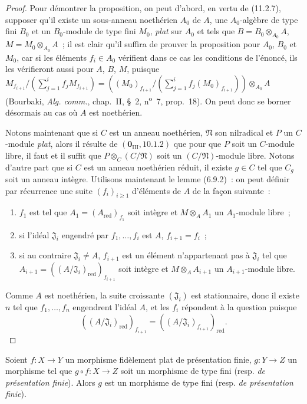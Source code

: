 \begin{proof}
Pour démontrer la proposition, on peut d'abord, en vertu de (11.2.7), supposer
qu'il existe un sous-anneau noethérien $A_0$ de $A$, une $A_0$-algèbre de type
fini $B_0$ et un $B_0$-module de type fini $M_0$, \emph{plat} sur $A_0$ et tels que
$B=B_0\otimes_{A_0}A$, $M=M_0\otimes_{A_0}A$~; il est clair qu'il suffira de
prouver la proposition pour $A_0$, $B_0$ et $M_0$, car si les éléments
$f_i\in A_0$ vérifient dans ce cas les conditions de l'énoncé, ils les
vérifieront aussi pour $A$, $B$, $M$, puisque
$M_{f_{i+1}}/(\sum_{j=1}^{i}f_jM_{f_{i+1}})
=((M_0)_{f_{i+1}}/(\sum_{j=1}^{i}f_j(M_0)_{f_{i+1}}))
\otimes_{A_0}A$
(Bourbaki, \emph{Alg. comm.}, chap.~II, \S~2, n\textsuperscript{o}~7, prop.~18). On
peut donc se borner désormais au cas où $A$ est noethérien.

Notons maintenant que si $C$ est un anneau noethérien, $\mathfrak N$ son
nilradical et $P$ un $C$-module \emph{plat}, alors il résulte de
$(\mathbf 0_{\mathrm{III}},10.1.2)$ que pour que $P$ soit un $C$-module libre,
il faut et il suffit que $P\otimes_C(C/\mathfrak N)$ soit un
$(C/\mathfrak N)$-module libre. Notons d'autre part que si $C$ est un anneau
noethérien réduit, il existe $g\in C$ tel que $C_g$ soit un anneau intègre.
Utilisons maintenant le lemme (6.9.2)~: on peut définir par récurrence une suite
$(f_i)_{i\geq1}$ d'éléments de $A$ de la façon suivante~:
\begin{enumerate}
\item[$1^\circ$] $f_1$ est tel que $A_1=(A_{\mathrm{red}})_{f_1}$ soit
intègre et $M\otimes_A A_1$ un $A_1$-module libre~;
\item[$2^\circ$] si l'idéal $\mathfrak J_i$ engendré par $f_1,\ldots,f_i$
est $A$, $f_{i+1}=f_i$~;
\item[$3^\circ$] si au contraire $\mathfrak J_i\neq A$, $f_{i+1}$ est un
élément n'appartenant pas à $\mathfrak J_i$ tel que
$A_{i+1}=((A/\mathfrak J_i)_{\mathrm{red}})_{f_{i+1}}$ soit intègre et
$M\otimes_A A_{i+1}$ un $A_{i+1}$-module libre.
\end{enumerate}

Comme $A$ est noethérien, la suite croissante $(\mathfrak J_i)$ est
stationnaire, donc il existe $n$ tel que $f_1,\ldots,f_n$ engendrent l'idéal
$A$, et les $f_i$ répondent à la question puisque
\[
((A/\mathfrak J_i)_{\mathrm{red}})_{f_{i+1}}
=((A/\mathfrak J_i)_{f_{i+1}})_{\mathrm{red}}.
\]
\end{proof}

\begin{proposition}[11.3.16]
\label{IV.11.3.16-fr}
Soient $f:X\to Y$ un morphisme fidèlement plat de présentation finie,
$g:Y\to Z$ un morphisme tel que $g\circ f:X\to Z$ soit un morphisme de type
fini \textup{(resp. \emph{de présentation finie})}. Alors $g$ est un morphisme de type fini
\textup{(resp. \emph{de présentation finie})}.
\end{proposition}

